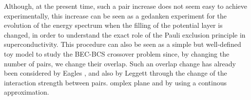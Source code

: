 \documentclass[aps,prb,superscriptaddress,twocolumn]{revtex4}
\begin{document}
Although, at the present time, such a pair increase
does not seem easy to achieve experimentally, this increase can be seen as a gedanken experiment
for the evolution of the energy spectrum when
the filling of the potential layer is changed, in order to understand the exact role of the Pauli
exclusion principle in superconductivity. 
This procedure can also be
seen as a simple but well-defined toy model to study the BEC-BCS crossover
problem
since, by changing the number of pairs, we change their overlap. Such an overlap change has already been considered by Eagles \cite{Eagle}, and also by Leggett \cite{LeggettCrossover} through the change of the interaction strength between pairs.
 omplex plane and by using a continous approximation.
\end{document}

